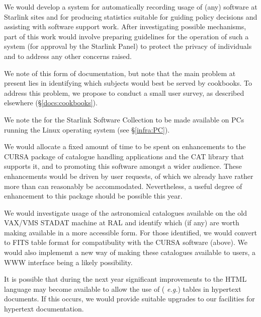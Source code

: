 {We would develop a system for automatically recording usage of (any)
software at Starlink sites and for producing statistics suitable for
guiding policy decisions and assisting with software support
work. After investigating possible mechanisms, part of this work would
involve preparing guidelines for the operation of such a system (for
approval by the Starlink Panel) to protect the privacy of individuals
and to address any other concerns raised.}

{We note  of this form
of documentation, but note that the main problem at present lies in
identifying which subjects would best be served by cookbooks. To
address this problem, we propose to conduct a small user survey, as
described elsewhere (\S\ref{docs:cookbooks}).}

{We note the  for the
Starlink Software Collection to be made available on PCs running the
Linux operating system (see \S\ref{infra:PC}).}

{We would allocate a fixed amount of time to be spent on enhancements
to the CURSA package of catalogue handling applications and the CAT
library that supports it, and to promoting this software amongst a
wider audience. These enhancements would be driven by user requests,
of which we already have rather more than can reasonably be
accommodated. Nevertheless, a useful degree of enhancement to this
package should be possible this year.}

{We would investigate usage of the astronomical catalogues available
on the old VAX/VMS STADAT machine at RAL and identify which (if any)
are worth making available in a more accessible form. For those
identified, we would convert to FITS table format for compatibulity
with the CURSA software (above). We would also implememt a new way of
making these catalogues available to users, a WWW interface being a
likely possibility.}

{It is possible that during the next year significant improvements to
the HTML language may become available to allow the use of ({\em
e.g.}) tables in hypertext documents. If this occurs, we would provide
suitable upgrades to our facilities for hypertext documentation.}

